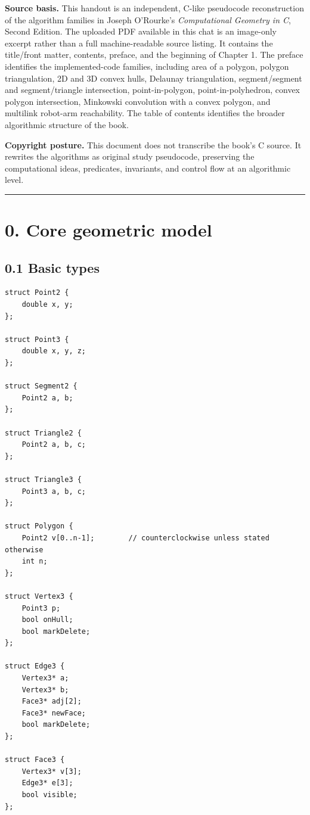 \documentclass[11pt]{article}
\begin{document}
\textbf{Source basis.} This handout is an independent, C-like pseudocode
reconstruction of the algorithm families in Joseph O'Rourke's
\emph{Computational Geometry in C}, Second Edition. The uploaded PDF
available in this chat is an image-only excerpt rather than a full
machine-readable source listing. It contains the title/front matter,
contents, preface, and the beginning of Chapter 1. The preface
identifies the implemented-code families, including area of a polygon,
polygon triangulation, 2D and 3D convex hulls, Delaunay triangulation,
segment/segment and segment/triangle intersection, point-in-polygon,
point-in-polyhedron, convex polygon intersection, Minkowski convolution
with a convex polygon, and multilink robot-arm reachability. The table
of contents identifies the broader algorithmic structure of the book.

\textbf{Copyright posture.} This document does not transcribe the book's
C source. It rewrites the algorithms as original study pseudocode,
preserving the computational ideas, predicates, invariants, and control
flow at an algorithmic level.

\begin{center}\rule{0.5\linewidth}{0.5pt}\end{center}

\section{0. Core geometric model}\label{core-geometric-model}

\subsection{0.1 Basic types}\label{basic-types}

\begin{verbatim}
struct Point2 {
    double x, y;
};

struct Point3 {
    double x, y, z;
};

struct Segment2 {
    Point2 a, b;
};

struct Triangle2 {
    Point2 a, b, c;
};

struct Triangle3 {
    Point3 a, b, c;
};

struct Polygon {
    Point2 v[0..n-1];        // counterclockwise unless stated otherwise
    int n;
};

struct Vertex3 {
    Point3 p;
    bool onHull;
    bool markDelete;
};

struct Edge3 {
    Vertex3* a;
    Vertex3* b;
    Face3* adj[2];
    Face3* newFace;
    bool markDelete;
};

struct Face3 {
    Vertex3* v[3];
    Edge3* e[3];
    bool visible;
};
\end{verbatim}
\end{document}
